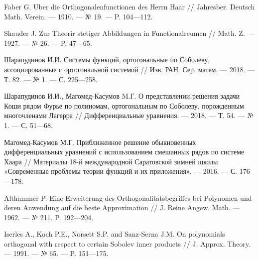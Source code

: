 \begin{thebibliography}{111}
Faber G. Uber die Orthogonalenfunctionen des Herrn Haar // Jahresber. Deutsch Math. Verein. --- 1910. --- № 19. --- P. 104---112.








Shauder J. Zur Theorir stetiger Abbildungen in Functionalreumen // Math. Z. --- 1927. --- № 26. --- P. 47---65.








Шарапудинов И.И. Системы функций, ортогональные по Соболеву, ассоциированные с ортогональной системой // Изв. РАН. Сер. матем. --- 2018. --- Т. 82. --- № 1. --- С. 225---258.








Шарапудинов И.И., Магомед-Касумов M.Г. О представлении решения задачи Коши  рядом Фурье  по полиномам, ортогональным по  Соболеву, порожденным многочленами Лагерра // Дифференциальные уравнения. --- 2018. --- Т. 54. --- № 1. --- С. 51---68.








Магомед-Касумов М.Г. Приближенное решение обыкновенных дифференциальных уравнений с использованием смешанных рядов по системе Хаара // Материалы 18-й международной Саратовской зимней школы «Современные проблемы теории функций и их приложения». --- 2016. --- С. 176---178.








Althammer P. Eine Erweiterung des Orthogonalitatsbegriffes bei Polynomen und deren Anwendung  auf die beste Approximation // J. Reine Angew. Math. --- 1962. --- № 211. P. 192---204.








Iserles A., Koch P.E., Norsett S.P. and Sanz-Serna J.M. On polynomials  orthogonal  with respect  to certain Sobolev inner products // J. Approx. Theory. --- 1991. --- № 65. --- P. 151---175.









\end{thebibliography}
